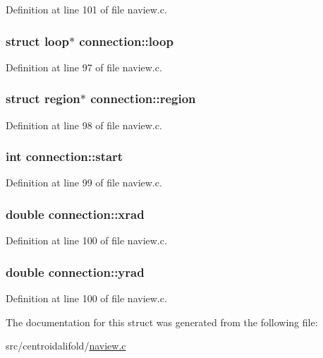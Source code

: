 Definition at line 101 of file naview.\+c.

\hypertarget{structconnection_abcf2970e1b12e7ea857edae5790fadbb}{
\subsubsection[{loop}]{\setlength{\rightskip}{0pt plus 5cm}struct {\bf loop}$\ast$ connection\+::loop}}\label{structconnection_abcf2970e1b12e7ea857edae5790fadbb}


Definition at line 97 of file naview.\+c.

\hypertarget{structconnection_a571d9b8fe86ebe537ad0b5e052bdc70a}{
\subsubsection[{region}]{\setlength{\rightskip}{0pt plus 5cm}struct {\bf region}$\ast$ connection\+::region}}\label{structconnection_a571d9b8fe86ebe537ad0b5e052bdc70a}


Definition at line 98 of file naview.\+c.

\hypertarget{structconnection_af0bdfc181a339d06558a27aca2177f96}{
\subsubsection[{start}]{\setlength{\rightskip}{0pt plus 5cm}int connection\+::start}}\label{structconnection_af0bdfc181a339d06558a27aca2177f96}


Definition at line 99 of file naview.\+c.

\hypertarget{structconnection_ae93b041e3b4c184d0a155a2cfa8ffdea}{
\subsubsection[{xrad}]{\setlength{\rightskip}{0pt plus 5cm}double connection\+::xrad}}\label{structconnection_ae93b041e3b4c184d0a155a2cfa8ffdea}


Definition at line 100 of file naview.\+c.

\hypertarget{structconnection_a2c32ebb1b452d1c8d3184f2bcfa23083}{
\subsubsection[{yrad}]{\setlength{\rightskip}{0pt plus 5cm}double connection\+::yrad}}\label{structconnection_a2c32ebb1b452d1c8d3184f2bcfa23083}


Definition at line 100 of file naview.\+c.



The documentation for this struct was generated from the following file\+:\begin{DoxyCompactItemize}
\item 
src/centroidalifold/\hyperlink{naview_8c}{naview.\+c}\end{DoxyCompactItemize}
